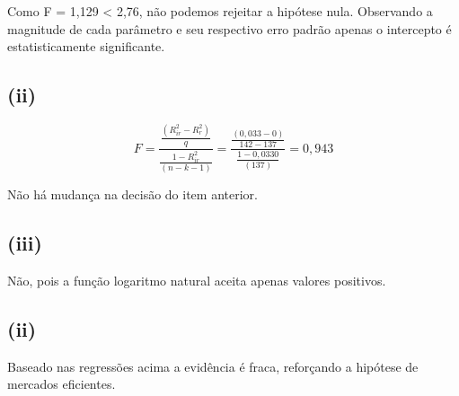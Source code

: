 \documentclass[hidelinks,11pt]{book}
\theoremstyle{definition}
\begin{document}
Como F = 1,129 < 2,76, não podemos rejeitar a hipótese nula. Observando a magnitude de cada parâmetro e seu respectivo erro padrão apenas o intercepto é estatisticamente significante.

\subsection*{(ii)}

\begin{displaymath}
	F = \frac{\frac{(R^{2}_{ir} - R^{2}_{r})}{q}}    {\frac{1 - R^{2}_{ir}}{(n-k-1)}} = \frac{\frac{(0,033 - 0)}{142 - 137}}    {\frac{1 - 0,0330}{(137)}} = 0,943
\end{displaymath}

Não há mudança na decisão do item anterior.

\subsection*{(iii)}

Não, pois a função logaritmo natural aceita apenas valores positivos.

\subsection*{(ii)}

Baseado nas regressões acima a evidência é fraca, reforçando a hipótese de mercados eficientes.
\end{document}
